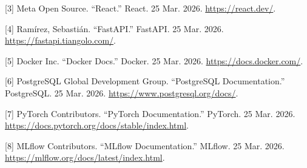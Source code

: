 \documentclass[12pt,a4paper]{report}
\begin{document}
[3] Meta Open Source. ``React.'' React. 25 Mar. 2026. \url{https://react.dev/}.

[4] Ram\'irez, Sebasti\'an. ``FastAPI.'' FastAPI. 25 Mar. 2026. \url{https://fastapi.tiangolo.com/}.

[5] Docker Inc. ``Docker Docs.'' Docker. 25 Mar. 2026. \url{https://docs.docker.com/}.

[6] PostgreSQL Global Development Group. ``PostgreSQL Documentation.'' PostgreSQL. 25 Mar. 2026. \url{https://www.postgresql.org/docs/}.

[7] PyTorch Contributors. ``PyTorch Documentation.'' PyTorch. 25 Mar. 2026. \url{https://docs.pytorch.org/docs/stable/index.html}.

[8] MLflow Contributors. ``MLflow Documentation.'' MLflow. 25 Mar. 2026. \url{https://mlflow.org/docs/latest/index.html}.
\end{document}
